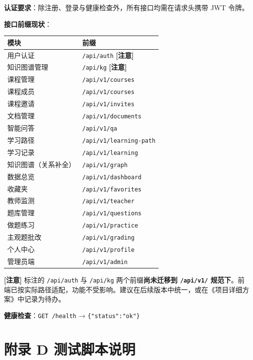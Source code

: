 \documentclass[UTF8,a4paper,11pt]{ctexrep}
\newcommand{\warnmark}{\textcolor{todobar}{\textbf{[注意]}}}
\begin{document}
\textbf{认证要求}：除注册、登录与健康检查外，所有接口均需在请求头携带 JWT 令牌。

\textbf{接口前缀现状}：

\begin{center}
\small
\begin{tabularx}{\linewidth}{@{}XX@{}}
\toprule
模块 & 前缀 \\
\midrule
用户认证 & \texttt{/api/auth} \warnmark{} \\
知识图谱管理 & \texttt{/api/kg} \warnmark{} \\
课程管理 & \texttt{/api/v1/courses} \\
课程成员 & \texttt{/api/v1/courses} \\
课程邀请 & \texttt{/api/v1/invites} \\
文档管理 & \texttt{/api/v1/documents} \\
智能问答 & \texttt{/api/v1/qa} \\
学习路径 & \texttt{/api/v1/learning-path} \\
学习记录 & \texttt{/api/v1/learning} \\
知识图谱（关系补全） & \texttt{/api/v1/graph} \\
数据总览 & \texttt{/api/v1/dashboard} \\
收藏夹 & \texttt{/api/v1/favorites} \\
教师监测 & \texttt{/api/v1/teacher} \\
题库管理 & \texttt{/api/v1/questions} \\
做题练习 & \texttt{/api/v1/practice} \\
主观题批改 & \texttt{/api/v1/grading} \\
个人中心 & \texttt{/api/v1/profile} \\
管理员端 & \texttt{/api/v1/admin} \\
\bottomrule
\end{tabularx}
\end{center}
\begin{todobox}
\warnmark{} 标注的 \texttt{/api/auth} 与 \texttt{/api/kg} 两个前缀\textbf{尚未迁移到 \texttt{/api/v1/} 规范下}。前端已按实际路径适配，功能不受影响。建议在后续版本中统一，或在《项目详细方案》中记录为待办。

\textbf{健康检查}：\texttt{GET /health} → \texttt{\{"status":"ok"\}}

\end{todobox}


\section*{附录 D 测试脚本说明}
\end{document}
